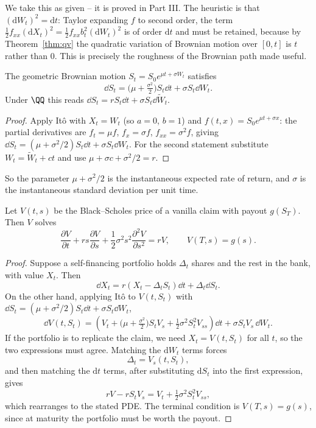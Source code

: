 We take this as given -- it is proved in Part III. The heuristic is that $(\mathrm{d}W_t)^2 = \mathrm{d}t$: Taylor expanding $f$ to second order, the term $\tfrac12 f_{xx}(\mathrm{d}X_t)^2 = \tfrac12 f_{xx}b_t^2(\mathrm{d}W_t)^2$ is of order $\mathrm{d}t$ and must be retained, because by Theorem~\ref{thm:qv} the quadratic variation of Brownian motion over $[0,t]$ is $t$ rather than $0$. This is precisely the roughness of the Brownian path made useful.

\begin{proposition}
	The geometric Brownian motion $S_t = S_0e^{\mu t + \sigma W_t}$ satisfies
	$$
	\dd S_t = \Big(\mu + \tfrac{\sigma^2}{2}\Big)S_t\dd t + \sigma S_t\dd W_t.
	$$
	Under $\QQ$ this reads $\dd S_t = rS_t\dd t + \sigma S_t\dd \tilde W_t$.
\end{proposition}

\begin{proof}
	Apply It\^o with $X_t = W_t$ (so $a = 0$, $b=1$) and $f(t,x) = S_0e^{\mu t + \sigma x}$: the partial derivatives are $f_t = \mu f$, $f_x = \sigma f$, $f_{xx} = \sigma^2 f$, giving $\dd S_t = (\mu + \sigma^2/2)S_t\dd t + \sigma S_t\dd W_t$. For the second statement substitute $W_t = \tilde W_t + ct$ and use $\mu + \sigma c + \sigma^2/2 = r$.
\end{proof}

So the parameter $\mu + \sigma^2/2$ is the instantaneous expected rate of return, and $\sigma$ is the instantaneous standard deviation per unit time.

\begin{theorem}\label{thm:bs-pde}
	Let $V(t,s)$ be the Black--Scholes price of a vanilla claim with payout $g(S_T)$. Then $V$ solves
	$$
	\frac{\partial V}{\partial t} + rs\frac{\partial V}{\partial s} + \frac{1}{2}\sigma^2s^2\frac{\partial^2V}{\partial s^2} = rV, \qquad V(T,s) = g(s).
	$$
\end{theorem}

\begin{proof}
	Suppose a self-financing portfolio holds $\Delta_t$ shares and the rest in the bank, with value $X_t$. Then
	$$
	\dd X_t = r(X_t - \Delta_tS_t)\dd t + \Delta_t\dd S_t.
	$$
	On the other hand, applying It\^o to $V(t,S_t)$ with $\dd S_t = (\mu+\sigma^2/2)S_t\dd t + \sigma S_t\dd W_t$,
	$$
	\dd V(t,S_t) = \left(V_t + \big(\mu+\tfrac{\sigma^2}{2}\big)S_tV_s + \tfrac12\sigma^2S_t^2V_{ss}\right)\dd t + \sigma S_tV_s\,\dd W_t.
	$$
	If the portfolio is to replicate the claim, we need $X_t = V(t,S_t)$ for all $t$, so the two expressions must agree. Matching the $\mathrm{d}W_t$ terms forces
	$$
	\Delta_t = V_s(t,S_t),
	$$
	and then matching the $\mathrm{d}t$ terms, after substituting $\mathrm{d}S_t$ into the first expression, gives
	$$
	rV - rS_tV_s = V_t + \tfrac12\sigma^2S_t^2V_{ss},
	$$
	which rearranges to the stated PDE. The terminal condition is $V(T,s) = g(s)$, since at maturity the portfolio must be worth the payout.
\end{proof}

